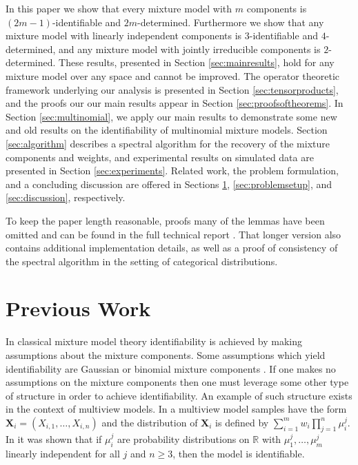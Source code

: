\documentclass[aos,preprint]{imsart}
\def\rn{\mathbb{R}}
\def\bX{\mathbf{X}}
\theoremstyle{plain}
\theoremstyle{defintion}
\begin{document}
	In this paper we show that every mixture model with $m$ components is $(2m - 1)$-identifiable and $2m$-determined. Furthermore we show that any mixture model with linearly independent components is $3$-identifiable and $4$-determined, and any mixture model with jointly irreducible components is $2$-determined. These results, presented in Section \ref{sec:mainresults}, hold for any mixture model over any space and cannot be improved. The operator theoretic framework underlying our analysis is presented in Section \ref{sec:tensorproducts}, and the proofs our our main results appear in Section \ref{sec:proofsoftheorems}. In Section \ref{sec:multinomial}, we apply our main results to demonstrate some new and old results on the identifiability of multinomial mixture models. Section \ref{sec:algorithm} describes a spectral algorithm for the recovery of the mixture components and weights, and experimental results on simulated data are presented in Section \ref{sec:experiments}. Related work, the problem formulation, and a concluding discussion are offered in Sections \ref{sec:previouswork}, \ref{sec:problemsetup}, and \ref{sec:discussion}, respectively.

To keep the paper length reasonable, proofs many of the lemmas have been omitted and can be found in the full technical report \cite{arxiv16}. That longer version also contains additional implementation details, as well as a proof of consistency of the spectral algorithm in the setting of categorical distributions.
\section{Previous Work} \label{sec:previouswork}
	In classical mixture model theory identifiability is achieved by making assumptions about the mixture components. Some assumptions which yield identifiability are Gaussian or binomial mixture components \cite{bruni85,teicher63}. If one makes no assumptions on the mixture components then one must leverage some other type of structure in order to achieve identifiability. An example of such structure exists in the context of multiview models. In a multiview model samples have the form $\bX_i = \left( X_{i,1},\ldots, X_{i,n} \right)$ and the distribution of $\bX_i$ is defined by $\sum_{i=1}^m w_i \prod_{j=1}^n \mu_i^j$. In \cite{allman09} it was shown that if $\mu_i^j$ are probability distributions on $\rn$ with $\mu_1^j,\ldots,\mu_m^j$ linearly independent for all $j$ and $n\ge 3$, then the model is identifiable.
\end{document}

